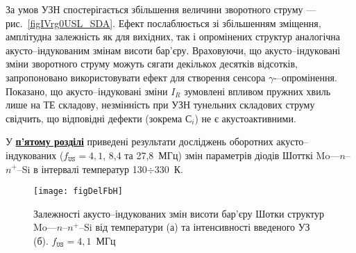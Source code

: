 За умов УЗН спостерігається збільшення величини зворотного струму --- рис.~\ref{figIVrg0USL_SDA}.
Ефект послаблюється зі збільшенням зміщення, амплітудна залежність як для вихідних, так і опромінених структур аналогічна акусто--індукованим змінам висоти бар'єру.
Враховуючи, що акусто--індуковані зміни зворотного струму можуть сягати декількох десятків відсотків,
запропоновано використовувати ефект для створення сенсора $\gamma$-–опромінення.
Показано, що акусто--індуковані зміни $I_R$ зумовлені впливом пружних хвиль лише на ТЕ складову,
незмінність при УЗН тунельних складових струму свідчить, що відповідні дефекти (зокрема С$_i$) не є акустоактивними.


У  \underline{\textbf{п'ятому розділі}} приведені результати досліджень
оборотних акусто--індукованих ($f_\mathtt{US}=4,1$, 8,4 та 27,8~МГц) змін параметрів діодів Шотткі Mo---$n$--$n^+$--Si в інтервалі температур 130$\div$330~К.

\begin{figure}
\center
\texttt{[image: figDelFbH]}
\caption{\label{figDelFbH}
Залежності акусто--індукованих змін висоти бар'єру Шотки структур Mo---$n$--$n^+$--Si від температури (а) та інтенсивності введеного УЗ (б).
$f_\mathtt{US}=4,1$~МГц
}%
\end{figure}

